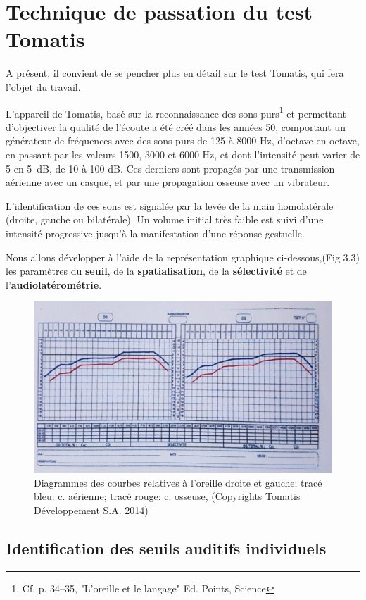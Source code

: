 \section{Technique de passation du test Tomatis}
A présent, il convient de se pencher plus en détail sur le test
Tomatis, qui fera l'objet du travail.

L'appareil de Tomatis, basé sur la reconnaissance des sons purs\footnote{Cf. p. 34--35, "L'oreille et le langage" Ed. Points, Science} et
permettant d'objectiver la qualité de l'écoute
 a été créé dans les années 50, comportant un générateur de fréquences
 avec
 des sons
  purs de 125 à 8000 Hz, d'octave en octave, en passant par les valeurs
1500, 3000 et 6000 Hz, et dont l'intensité peut varier de 5 en \SI{5}{\dB}, de 10 à 100 dB.
Ces derniers sont propagés par une
  transmission aérienne avec un casque, et par une propagation osseuse
  avec un vibrateur.

  L'identification de ces sons est
  signalée par la levée de la main homolatérale (droite, gauche ou
  bilatérale).
Un volume initial très faible est suivi d'une intensité
progressive jusqu'à la manifestation d'une réponse gestuelle.

Nous allons développer à l'aide de la représentation
graphique ci-dessous,(Fig 3.3) les paramètres du\textbf{ seuil}, de la
\textbf{spatialisation}, de la \textbf{sélectivité} et de l'\textbf{au\-dio\-latérométrie}.


\begin{figure}
	\centering
	\includegraphics[width=0.7\linewidth]{images/courbeideale.jpg}
	\caption{Diagrammes des courbes relatives à l'oreille droite et
          gauche; tracé bleu: c. aérienne; tracé rouge: c.
          osseuse, (Copyrights Tomatis Développement S.A.  2014) }
	\label{fig:courbeideale}
\end{figure}




\subsection{Identification des seuils auditifs individuels}

